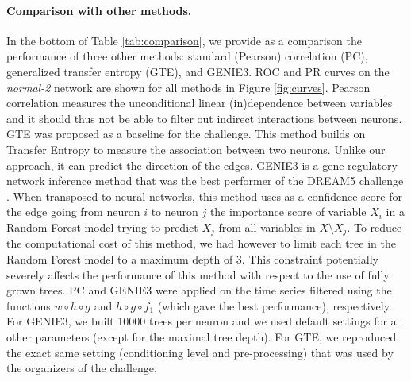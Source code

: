 \documentclass[wcp]{jmlr}
\begin{document}
\paragraph{Comparison with other methods.}

In the bottom of Table \ref{tab:comparison}, we provide as a comparison the
performance of three other methods: standard (Pearson) correlation (PC),
generalized transfer entropy (GTE), and GENIE3. ROC and PR curves on the
\textit{normal-2} network are shown for all methods in Figure
\ref{fig:curves}. Pearson correlation measures the unconditional linear
(in)dependence between variables and it should thus not be able to filter out
indirect interactions between neurons. GTE \citep{stetter2012model} was
proposed as a baseline for the challenge. This method builds on Transfer
Entropy to measure the association between two neurons. Unlike our approach, it
can predict the direction of the edges. GENIE3 \citep{huynhthu2010inferring} is
a gene regulatory network inference method that was the best performer of the
DREAM5 challenge \citep{marbach2012}. When transposed to neural networks, this
method uses as a confidence score for the edge going from neuron $i$ to neuron
$j$ the importance score of variable $X_i$ in a Random Forest model trying to
predict $X_j$ from all variables in $X\setminus X_j$. To reduce the
computational cost of this method, we had however to limit each tree in the
Random Forest model to a maximum depth of 3. This constraint potentially
severely affects the performance of this method with respect to the use of
fully grown trees. PC and GENIE3 were applied on the time series filtered using the functions $w\circ h\circ g$ and $h\circ g\circ f_1$ (which
gave the best performance), respectively. For GENIE3, we built 10000 trees per neuron and we
used default settings for all other parameters (except for the maximal tree
depth). For GTE, we reproduced the exact same setting (conditioning level and
pre-processing) that was used by the organizers of the challenge.

\end{document}
